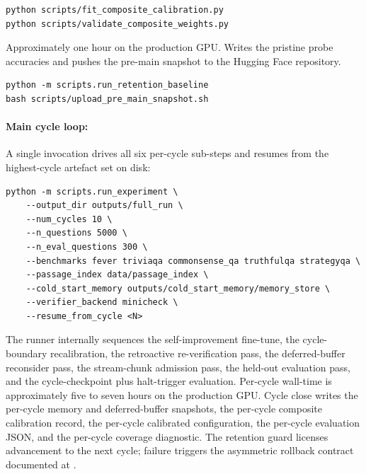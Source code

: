 \begin{description}[style=nextline,leftmargin=0pt]
\begin{verbatim}
python scripts/fit_composite_calibration.py
python scripts/validate_composite_weights.py
\end{verbatim}
\item[Retention baseline freeze and snapshot upload.] Approximately one hour on the production GPU. Writes the pristine probe accuracies and pushes the pre-main snapshot to the Hugging Face repository.
\begin{verbatim}
python -m scripts.run_retention_baseline
bash scripts/upload_pre_main_snapshot.sh
\end{verbatim}
\end{description}

\paragraph{Main cycle loop:} A single invocation drives all six per-cycle sub-steps and resumes from the highest-cycle artefact set on disk:
\begin{verbatim}
python -m scripts.run_experiment \
    --output_dir outputs/full_run \
    --num_cycles 10 \
    --n_questions 5000 \
    --n_eval_questions 300 \
    --benchmarks fever triviaqa commonsense_qa truthfulqa strategyqa \
    --passage_index data/passage_index \
    --cold_start_memory outputs/cold_start_memory/memory_store \
    --verifier_backend minicheck \
    --resume_from_cycle <N>
\end{verbatim}
The runner internally sequences the self-improvement fine-tune, the cycle-boundary recalibration, the retroactive re-verification pass, the deferred-buffer reconsider pass, the stream-chunk admission pass, the held-out evaluation pass, and the cycle-checkpoint plus halt-trigger evaluation. Per-cycle wall-time is approximately five to seven hours on the production GPU. Cycle close writes the per-cycle memory and deferred-buffer snapshots, the per-cycle composite calibration record, the per-cycle calibrated configuration, the per-cycle evaluation JSON, and the per-cycle coverage diagnostic. The retention guard licenses advancement to the next cycle; failure triggers the asymmetric rollback contract documented at .

